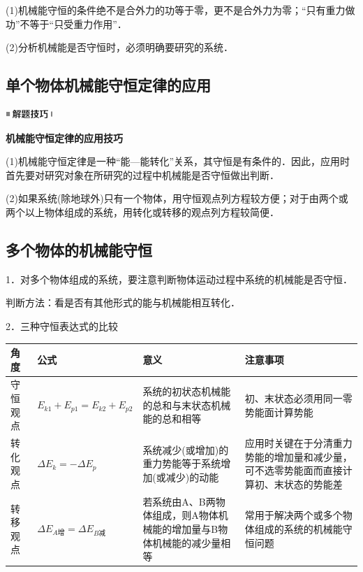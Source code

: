 \documentclass[cn,10.5pt,chinese,mac,chinesefont=founder]{elegantbook}
\begin{document}
(1)机械能守恒的条件绝不是合外力的功等于零，更不是合外力为零；``只有重力做功''不等于``只受重力作用''．

(2)分析机械能是否守恒时，必须明确要研究的系统．


\subsection{单个物体机械能守恒定律的应用}

\begin{center}\includegraphics[width=0.70764in,height=0.12292in]{media/image37.png}

\textbf{机械能守恒定律的应用技巧}
\end{center}


(1)机械能守恒定律是一种``能---能转化''关系，其守恒是有条件的．因此，应用时首先要对研究对象在所研究的过程中机械能是否守恒做出判断．

(2)如果系统(除地球外)只有一个物体，用守恒观点列方程较方便；对于由两个或两个以上物体组成的系统，用转化或转移的观点列方程较简便．



\newpage
\subsection{多个物体的机械能守恒}

1．对多个物体组成的系统，要注意判断物体运动过程中系统的机械能是否守恒．

判断方法：看是否有其他形式的能与机械能相互转化．

2．三种守恒表达式的比较

\begin{longtable}[]{@{}m{0.8cm}m{3.5cm}m{5cm}m{4cm}@{}}
\toprule
角度 & 公式 & 意义 & 注意事项\tabularnewline
\midrule
\endhead

守恒
观点
&
$E_{k1}+E_{p1}=E_{k2}+E_{p2}$
&
系统的初状态机械能的总和与末状态机械能的总和相等
&
初、末状态必须用同一零势能面计算势能
\tabularnewline

转化
观点
&
$\Delta E_k=-\Delta E_p$
&
系统减少(或增加)的重力势能等于系统增加(或减少)的动能
&
应用时关键在于分清重力势能的增加量和减少量，可不选零势能面而直接计算初、末状态的势能差
\tabularnewline

转移
观点
&
$\Delta E_{A\text{增}}=
\Delta E_{B\text{减}}$
&
若系统由A、B两物体组成，则A物体机械能的增加量与B物体机械能的减少量相等
&
常用于解决两个或多个物体组成的系统的机械能守恒问题\tabularnewline
\bottomrule
\end{longtable}
\end{document}

